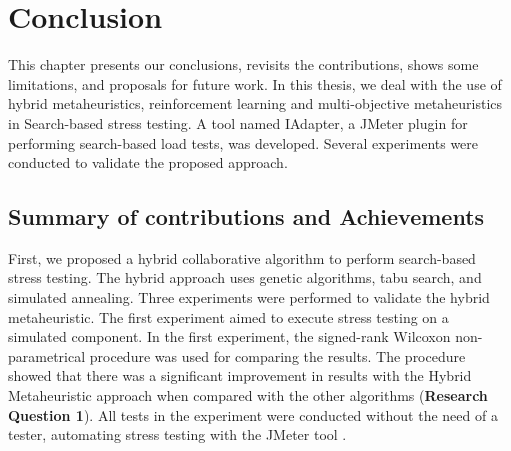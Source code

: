 \documentclass[espaco=umemeio,chapter=TITLE,twoside,openright]{abnt}
\begin{document}









%
%
%
\chapter{Conclusion}

This chapter presents our conclusions, revisits the contributions, shows some limitations, and proposals for future work. In this thesis, we deal with the use of hybrid metaheuristics, reinforcement learning and multi-objective metaheuristics in Search-based stress testing. A tool named IAdapter, a JMeter plugin for performing search-based load tests, was developed. Several experiments were conducted to validate the proposed approach.

\section{Summary of contributions and Achievements}


First, we proposed a hybrid collaborative algorithm to perform search-based stress testing.  The hybrid approach uses genetic algorithms, tabu search, and simulated annealing. Three experiments were performed to validate the hybrid metaheuristic. The first experiment aimed to execute stress testing on a simulated component.  In the first experiment, the signed-rank Wilcoxon non-parametrical procedure was used for comparing the results. The procedure showed that there was a significant improvement in  results with the Hybrid Metaheuristic approach when compared with the other algorithms (\textbf{Research Question 1}). All tests in the experiment were conducted without the need of a tester, automating  stress testing with the JMeter tool \cite{Gois2016}. 
\end{document}
